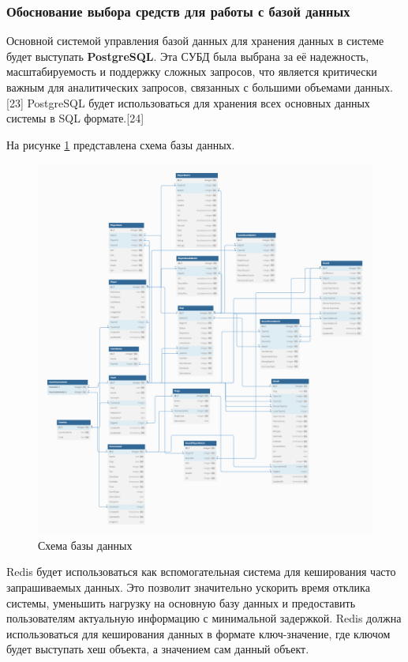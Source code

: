 \subsubsection{Обоснование выбора средств для работы с базой данных}

Основной  системой управления базой данных для хранения данных в системе будет выступать \textbf{PostgreSQL}. Эта СУБД была выбрана за её надежность, масштабируемость и поддержку сложных запросов, что является критически важным для аналитических запросов, связанных с большими объемами данных.[23] PostgreSQL будет использоваться для хранения всех основных данных системы в SQL формате.[24]

На рисунке \ref{fig:-bd} представлена схема базы данных.
\begin{figure}
	\centering
	\includegraphics[width=1\linewidth]{"images/База данных"}
	\caption{Схема базы данных}
	\label{fig:-bd}
\end{figure}

Redis будет использоваться как вспомогательная система для кеширования часто запрашиваемых данных. Это позволит значительно ускорить время отклика системы, уменьшить нагрузку на основную базу данных и предоставить пользователям актуальную информацию с минимальной задержкой. Redis должна использоваться для кеширования данных в формате ключ-значение, где ключом будет выступать хеш объекта, а значением сам данный объект.

